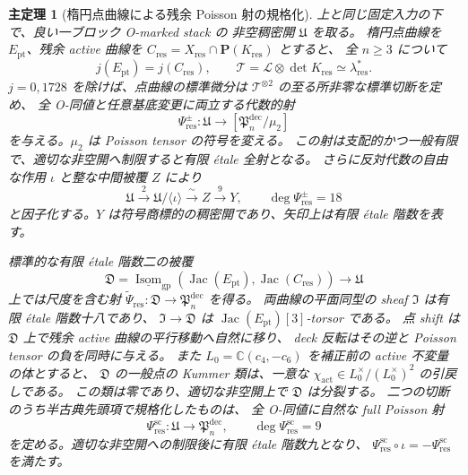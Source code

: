 \documentclass[11pt,a4paper]{ltjsarticle}
\numberwithin{equation}{section}
\newtheorem{maintheorem}{主定理}
\newcommand{\C}{\mathbb C}
\begin{document}
\begin{maintheorem}[楕円点曲線による残余 Poisson 射の規格化]
上と同じ固定入力の下で、良い一ブロック O-marked stack の
非空稠密開 $\mathfrak U$ を取る。
楕円点曲線を $E_{\mathrm{pt}}$、残余 active 曲線を
$C_{\mathrm{res}}=X_{\mathrm{res}}\cap\mathbf P(K_{\mathrm{res}})$ とすると、
全 $n\ge3$ について
\[
 j(E_{\mathrm{pt}})=j(C_{\mathrm{res}}),\qquad
 \mathscr T=\mathcal L\otimes\det K_{\mathrm{res}}
     \simeq\lambda_{\mathrm{res}}^*.
\]
$j=0,1728$ を除けば、点曲線の標準微分は
$\mathscr T^{\otimes2}$ の至る所非零な標準切断を定め、
全 O-同値と任意基底変更に両立する代数的射
\[
 \Psi_{\mathrm{res}}^\pm:\mathfrak U
    \longrightarrow[\mathfrak P_n^{\mathrm{dec}}/\mu_2]
\]
を与える。$\mu_2$ は Poisson tensor の符号を変える。
この射は支配的かつ一般有限で、適切な非空開へ制限すると有限 étale 全射となる。
さらに反対代数の自由な作用 $\iota$ と整な中間被覆 $Z$ により
\[
 \mathfrak U\xrightarrow{\ 2\ }\mathfrak U/\langle\iota\rangle
       \xrightarrow{\ \sim\ }Z\xrightarrow{\ 9\ }Y,
 \qquad \deg\Psi_{\mathrm{res}}^\pm=18
\]
と因子化する。$Y$ は符号商標的の稠密開であり、矢印上は有限 étale 階数を表す。

標準的な有限 étale 階数二の被覆
\[
 \mathfrak D=
 \underline{\operatorname{Isom}}_{\mathrm{gp}}
 (\operatorname{Jac}(E_{\mathrm{pt}}),\operatorname{Jac}(C_{\mathrm{res}}))
 \longrightarrow\mathfrak U
\]
上では尺度を含む射
$\widetilde\Psi_{\mathrm{res}}:\mathfrak D\to\mathfrak P_n^{\mathrm{dec}}$ を得る。
両曲線の平面同型の sheaf $\mathfrak I$ は有限 étale 階数十八であり、
$\mathfrak I\to\mathfrak D$ は $\operatorname{Jac}(E_{\mathrm{pt}})[3]$-torsor である。
点 shift は $\mathfrak D$ 上で残余 active 曲線の平行移動へ自然に移り、
deck 反転はその逆と Poisson tensor の負を同時に与える。
また $L_0=\C(c_4,-c_6)$ を補正前の active 不変量の体とすると、
$\mathfrak D$ の一般点の Kummer 類は、一意な
$\chi_{\mathrm{act}}\in L_0^\times/(L_0^\times)^2$ の引戻しである。
この類は零であり、適切な非空開上で $\mathfrak D$ は分裂する。
二つの切断のうち半古典先頭項で規格化したものは、
全 O-同値に自然な full Poisson 射
\[
 \Psi_{\mathrm{res}}^{\mathrm{sc}}:
 \mathfrak U\longrightarrow\mathfrak P_n^{\mathrm{dec}},
 \qquad\deg\Psi_{\mathrm{res}}^{\mathrm{sc}}=9
\]
を定める。適切な非空開への制限後に有限 \'etale 階数九となり、
$\Psi_{\mathrm{res}}^{\mathrm{sc}}\circ\iota
 =-\Psi_{\mathrm{res}}^{\mathrm{sc}}$ を満たす。
\end{maintheorem}
\end{document}
